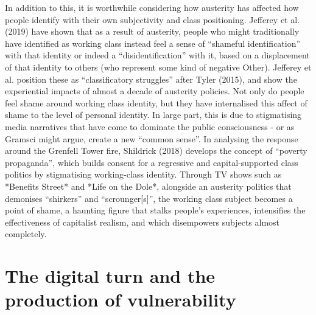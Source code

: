 In addition to this, it is worthwhile considering how austerity has
affected how people identify with their own subjectivity and class
positioning. Jefferey et al. (2019) have shown that as a result of
austerity, people who might traditionally have identified as working
class instead feel a sense of ``shameful identification'' with that
identity or indeed a ``disidentification'' with it, based on a
displacement of that identity to others (who represent some kind of
negative Other). Jefferey et al. position these as ``classificatory
struggles'' after Tyler (2015), and show the experiential impacts of
almost a decade of austerity policies. Not only do people feel shame
around working class identity, but they have internalised this affect of
shame to the level of personal identity. In large part, this is due to
stigmatising media narratives that have come to dominate the public
consciousness - or as Gramsci might argue, create a new ``common
sense''. In analysing the response around the Grenfell Tower fire,
Shildrick (2018) develops the concept of ``poverty propaganda'', which
builds consent for a regressive and capital-supported class politics by
stigmatising working-class identity. Through TV shows such as *Benefits
Street* and *Life on the Dole*, alongside an austerity politics that
demonises ``shirkers'' and ``scrounger{[}s{]}'', the working class
subject becomes a point of shame, a haunting figure that stalks people's
experiences, intensifies the effectiveness of capitalist realism, and
which disempowers subjects almost completely.

\section{The digital turn and the production of vulnerability }
\label{the-digital-turn-and-the-production-of-vulnerability}

